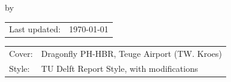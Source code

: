 \begin{titlepage}

\begin{center}

{\makeatletter
\largetitlestyle\fontsize{45}{45}\selectfont\@title
\makeatother}

{\makeatletter
\ifdefvoid{\@subtitle}{}{\bigskip\titlestyle\fontsize{20}{20}\selectfont\@subtitle}
\makeatother}

\bigskip
\bigskip

by

\bigskip
\bigskip

{\makeatletter
\largetitlestyle\fontsize{25}{25}\selectfont\@author
\makeatother}

\bigskip
\bigskip


\vfill

\begin{tabular}{ll}
    Last updated: & \today 
\end{tabular}

\bigskip
\bigskip

\begin{tabular}{p{15mm}p{10cm}}
    Cover: & Dragonfly PH-HBR, Teuge Airport (TW. Kroes) \\
    Style: & TU Delft Report Style, with modifications
\end{tabular}

\end{center}


\end{titlepage}
